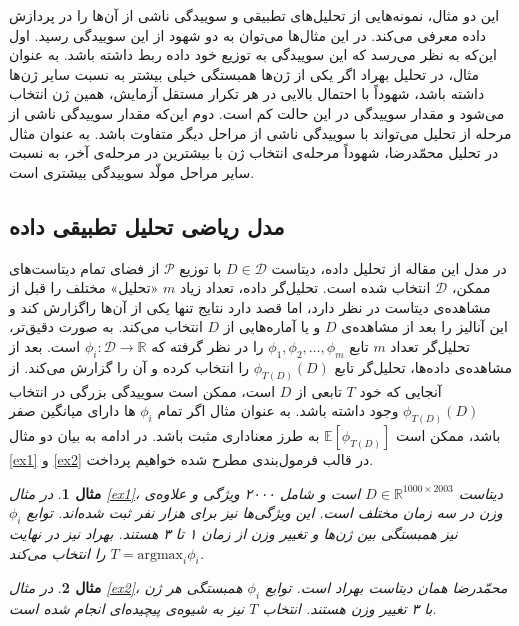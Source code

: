\documentclass[a4paper,12pt]{article}
\newtheorem{exa}{{\large\bf مثال}}[section]
\newcommand{\E}{\mathbb{E}}
\begin{document}
	این دو مثال، نمونه‌هایی از تحلیل‌های تطبیقی و سوییدگی ناشی از آن‌ها را در پردازش داده معرفی می‌کند. در این مثال‌ها می‌توان به دو شهود از این سوییدگی رسید. اول این‌که به نظر می‌رسد که این سوییدگی به توزیع  خود داده ربط داشته باشد. به عنوان مثال، در تحلیل بهراد اگر یکی از ژن‌ها همبستگی خیلی بیشتر به نسبت سایر ژن‌ها داشته باشد، شهوداً با احتمال بالایی در هر تکرار مستقل آزمایش، همین ژن انتخاب می‌شود و مقدار سوییدگی در این حالت کم است. دوم این‌که  مقدار سوییدگی ناشی از مرحله از تحلیل می‌تواند با سوییدگی ناشی از مراحل دیگر متفاوت باشد. به عنوان مثال در تحلیل محمّدرضا، شهوداً مرحله‌ی انتخاب ژن با بیشترین 
	در مرحله‌ی آخر، به نسبت سایر مراحل مولّد سوییدگی بیشتری است.
	
	\subsection{مدل ریاضی تحلیل تطبیقی داده}
	در مدل این مقاله از تحلیل داده، دیتاست 
	$D\in \mathcal{D}$
	با توزیع 
	$\mathcal{P}$
	از فضای تمام دیتاست‌های ممکن،
	$\mathcal{D}$
	انتخاب شده است. تحلیل‌گر داده، تعداد زیاد $m$ «تحلیل» مختلف را قبل از مشاهده‌ی دیتاست در نظر دارد، اما قصد دارد نتایج تنها یکی از  آن‌ها راگزارش کند و این آنالیز را بعد از مشاهده‌ی 
	$D$
	و یا آماره‌هایی از 
	$D$
	انتخاب می‌کند. به صورت دقیق‌تر، تحلیل‌گر تعداد $m$ تابع 
	$\phi_1, \phi_2, \dots, \phi_m$
	را در نظر گرفته که 
	$\phi_i: \mathcal{D} \to \mathbb{R}$
	است.  بعد از مشاهده‌ی داده‌ها، تحلیل‌گر تابع 
	$\phi_{T(D)}(D)$
	را انتخاب کرده و آن را گزارش می‌کند. از آنجایی که خود 
	$T$
	تابعی از 
	$D$
	است، ممکن است سوییدگی بزرگی در انتخاب
	$\phi_{T(D)}(D)$
	وجود داشته باشد. به عنوان مثال اگر تمام 
	$\phi_i$
	ها دارای میانگین صفر باشد، ممکن است
	$\E[\phi_{T(D)}]$
	به طرز معناداری مثبت باشد. در ادامه به بیان دو مثال 
	\eqref{ex1}
	و
	\eqref{ex2}
	در قالب فرمول‌بندی مطرح شده خواهیم پرداخت.
	
	\begin{exa}
		در مثال 
		\eqref{ex1}،
		دیتاست
		$D \in \mathbb{R}^{1000\times 2003}$ 
		است و شامل ۲۰۰۰ ویژگی و علاوه‌ی وزن در سه زمان مختلف است. این ویژگی‌ها نیز برای هزار نفر ثبت شده‌اند. توابع 
		$\phi_i$
		نیز همبستگی بین ژن‌ها و تغییر وزن از زمان ۱ تا ۳ هستند. بهراد نیز در نهایت
		$T = \mathrm{argmax}_i \phi_i$
		را انتخاب می‌کند.
	\end{exa}
	
	\begin{exa}
		در مثال
		\eqref{ex2}،
		محمّدرضا همان دیتاست بهراد است. توابع 
		$\phi_i$
		همبستگی هر ژن با ۳ تغییر وزن هستند. انتخاب 
		$T$
		نیز به شیوه‌ی پیچیده‌ای انجام شده است.
	\end{exa}
	
\end{document}

